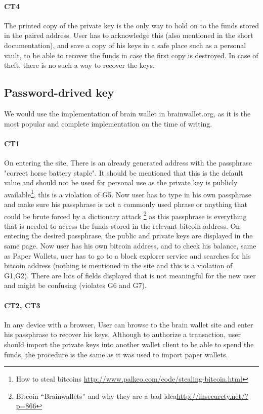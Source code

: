 \paragraph{CT4} The printed copy of the private key is the only way to hold on to the funds stored in the paired address. User has to acknowledge this (also mentioned in the short documentation), and save a copy of his keys in a safe place such as a personal vault, to be able to recover the funds in case the first copy is destroyed. In case of theft, there is no such a way to recover the keys.


\subsection{Password-drived key} We would use the implementation of brain wallet in brainwallet.org, as it is the most popular and complete implementation on the time of writing.

\paragraph{CT1} On entering the site, There is an already generated address with the passphrase "correct horse battery staple". It should be mentioned that this is the default value and should not be used for personal use as the private key is publicly available\footnote{How to steal bitcoins \url{http://www.palkeo.com/code/stealing-bitcoin.html}}, this is a violation of G5. Now user has to type in his own passphrase and make sure his passphrase is not a commonly used phrase or anything that could be brute forced by a dictionary attack \footnote{Bitcoin “Brainwallets” and why they are a bad idea\url{http://insecurety.net/?p=866}} as this passphrase is everything that is needed to access the funds stored in the relevant bitcoin address. On entering the desired passphrase, the public and private keys are displayed in the same page. Now user has his own bitcoin address, and to check his balance, same as Paper Wallets, user has to go to a block explorer service and searches for his bitcoin address (nothing is mentioned in the site and this is a violation of G1,G2). There are lots of fields displayed that is not meaningful for the new user and might be confusing (violates G6 and G7).

\paragraph{CT2, CT3} In any device with a browser, User can browse to the brain wallet site and enter his passphrase to recover his keys. Although to authorize a transaction, user should import the private keys into another wallet client to be able to spend the funds, the procedure is the same as it was used to import paper wallets.

